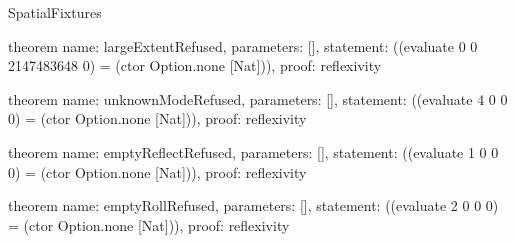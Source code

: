 \begin{lexlean}{SpatialFixtures}
\begin{semanticmodule}
theorem{
  name: largeExtentRefused,
  parameters: [],
  statement: ((evaluate 0 0 2147483648 0) = (ctor Option.none [Nat])),
  proof: reflexivity{}
}

theorem{
  name: unknownModeRefused,
  parameters: [],
  statement: ((evaluate 4 0 0 0) = (ctor Option.none [Nat])),
  proof: reflexivity{}
}

theorem{
  name: emptyReflectRefused,
  parameters: [],
  statement: ((evaluate 1 0 0 0) = (ctor Option.none [Nat])),
  proof: reflexivity{}
}

theorem{
  name: emptyRollRefused,
  parameters: [],
  statement: ((evaluate 2 0 0 0) = (ctor Option.none [Nat])),
  proof: reflexivity{}
}
\end{semanticmodule}
\end{lexlean}
